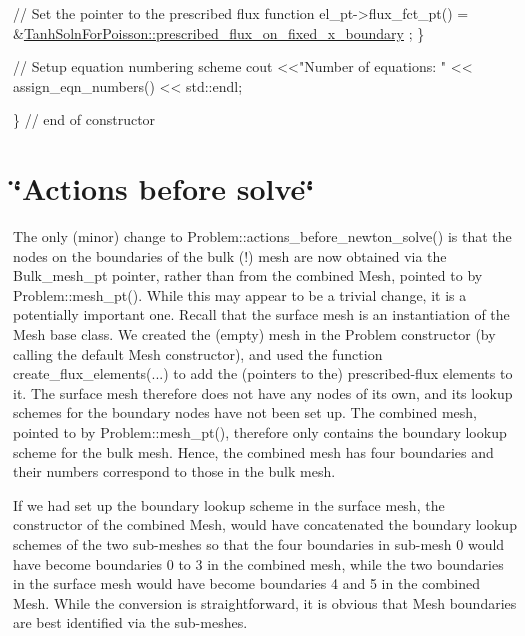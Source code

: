 \begin{DoxyCodeInclude}
   \textcolor{comment}{// Set the pointer to the prescribed flux function}
   el\_pt->flux\_fct\_pt() = 
    &\hyperlink{namespaceTanhSolnForPoisson_a0e99ccf27df36f28f091de6d57484172}{TanhSolnForPoisson::prescribed\_flux\_on\_fixed\_x\_boundary}
      ;
  \}

 \textcolor{comment}{// Setup equation numbering scheme}
 cout <<\textcolor{stringliteral}{"Number of equations: "} << assign\_eqn\_numbers() << std::endl; 

\} \textcolor{comment}{// end of constructor}

\end{DoxyCodeInclude}




 

\hypertarget{index_actions_before}{}\section{\char`\"{}\+Actions before solve\char`\"{}}\label{index_actions_before}
The only (minor) change to {\ttfamily Problem\+::actions\+\_\+before\+\_\+newton\+\_\+solve()} is that the nodes on the boundaries of the bulk (!) mesh are now obtained via the {\ttfamily Bulk\+\_\+mesh\+\_\+pt} pointer, rather than from the combined {\ttfamily Mesh}, pointed to by {\ttfamily Problem\+::mesh\+\_\+pt()}. While this may appear to be a trivial change, it is a potentially important one. Recall that the surface mesh is an instantiation of the {\ttfamily Mesh} base class. We created the (empty) mesh in the {\ttfamily Problem} constructor (by calling the default {\ttfamily Mesh} constructor), and used the function {\ttfamily create\+\_\+flux\+\_\+elements}(...) to add the (pointers to the) prescribed-\/flux elements to it. The surface mesh therefore does not have any nodes of its own, and its lookup schemes for the boundary nodes have not been set up. The combined mesh, pointed to by {\ttfamily Problem\+::mesh\+\_\+pt()}, therefore only contains the boundary lookup scheme for the bulk mesh. Hence, the combined mesh has four boundaries and their numbers correspond to those in the bulk mesh.

If we had set up the boundary lookup scheme in the surface mesh, the constructor of the combined {\ttfamily Mesh}, would have concatenated the boundary lookup schemes of the two sub-\/meshes so that the four boundaries in sub-\/mesh 0 would have become boundaries 0 to 3 in the combined mesh, while the two boundaries in the surface mesh would have become boundaries 4 and 5 in the combined {\ttfamily Mesh}. While the conversion is straightforward, it is obvious that {\ttfamily Mesh} boundaries are best identified via the sub-\/meshes.


